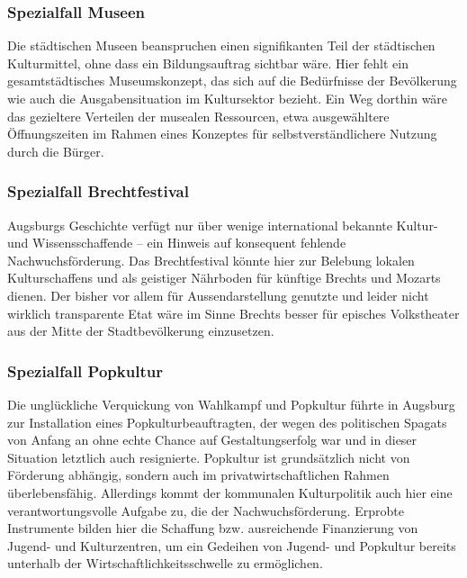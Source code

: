   \subsubsection{Spezialfall Museen}
  
  Die städtischen Museen beanspruchen einen signifikanten Teil der 
  städtischen Kulturmittel, ohne dass ein Bildungsauftrag sichtbar wäre. Hier 
  fehlt ein gesamtstädtisches Museumskonzept, das sich auf die Bedürfnisse 
  der Bevölkerung wie auch die Ausgabensituation im Kultursektor bezieht. Ein 
  Weg dorthin wäre das gezieltere Verteilen der musealen Ressourcen, etwa 
  ausgewähltere Öffnungszeiten im Rahmen eines Konzeptes für 
  selbstverständlichere Nutzung durch die Bürger.
  
  \subsubsection{Spezialfall Brechtfestival}
  
  Augsburgs Geschichte verfügt nur über wenige international bekannte Kultur- 
  und Wissensschaffende – ein Hinweis auf konsequent fehlende 
  Nachwuchsförderung. Das Brechtfestival könnte hier zur Belebung lokalen 
  Kulturschaffens und als geistiger Nährboden für künftige Brechts und 
  Mozarts dienen. Der bisher vor allem für Aussendarstellung genutzte und 
  leider nicht wirklich transparente Etat wäre im Sinne Brechts besser für 
  episches Volkstheater aus der Mitte der Stadtbevölkerung einzusetzen.
  
  \subsubsection{Spezialfall Popkultur}
  
  Die unglückliche Verquickung von Wahlkampf und Popkultur führte in Augsburg 
  zur Installation eines Popkulturbeauftragten, der wegen des politischen 
  Spagats von Anfang an ohne echte Chance auf Gestaltungserfolg war und in 
  dieser Situation letztlich auch resignierte. Popkultur ist grundsätzlich 
  nicht von Förderung abhängig, sondern auch im privatwirtschaftlichen Rahmen 
  überlebensfähig. Allerdings kommt der kommunalen Kulturpolitik auch hier 
  eine verantwortungsvolle Aufgabe zu, die der Nachwuchsförderung. Erprobte 
  Instrumente bilden hier die Schaffung bzw. ausreichende Finanzierung von 
  Jugend- und Kulturzentren, um ein Gedeihen von Jugend- und Popkultur 
  bereits unterhalb der Wirtschaftlichkeitsschwelle zu ermöglichen. 
  
